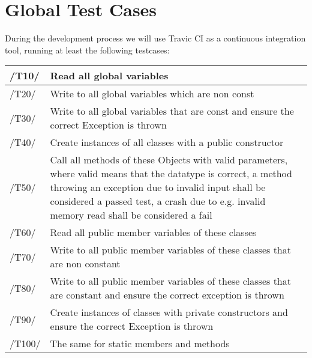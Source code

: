 \chapter{Global Test Cases}
During the development process we will use Travic CI as a continuous integration tool, running at least the following testcases: \\

\begin{longtable}{|p{1cm} | p{15cm}|}
   \hline
  /T10/ & Read all global variables \\
  \hline
  /T20/ & Write to all global variables which are non const \\
  \hline
  /T30/ & Write to all global variables that are const and ensure the correct Exception is thrown \\
  \hline
  /T40/ & Create instances of all classes with a public constructor \\
  \hline
  /T50/ & Call all methods of these Objects with valid parameters, where valid means that the 	datatype is correct, a method throwing an exception due to invalid input shall be considered a passed test, a crash due to e.g. invalid memory read shall be considered a fail \\
  \hline
  /T60/ & Read all public member variables of these classes \\
  \hline
  /T70/ & Write to all public member variables of these classes that are non constant \\
  \hline
  /T80/ & Write to all public member variables of these classes that are constant and ensure the correct exception is thrown \\
  \hline
  /T90/ & Create instances of classes with private constructors and ensure the correct Exception is thrown \\
  \hline
  /T100/ &  The same for static members and methods \\
   \hline
\end{longtable}
